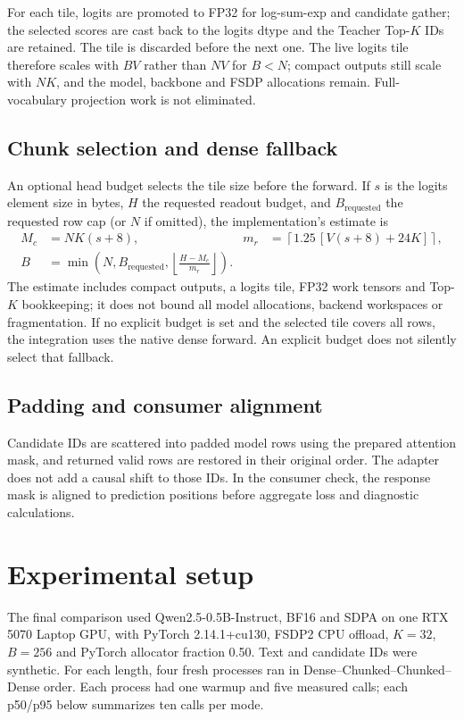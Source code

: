 \documentclass[11pt,a4paper]{article}
\begin{document}
For each tile, logits are promoted to FP32 for log-sum-exp and candidate gather; the selected scores are cast back to the logits dtype and the Teacher Top-$K$ IDs are retained. The tile is discarded before the next one. The live logits tile therefore scales with $BV$ rather than $NV$ for $B<N$; compact outputs still scale with $NK$, and the model, backbone and FSDP allocations remain. Full-vocabulary projection work is not eliminated.

\subsection{Chunk selection and dense fallback}
An optional head budget selects the tile size before the forward. If $s$ is the logits element size in bytes, $H$ the requested readout budget, and $B_{\mathrm{requested}}$ the requested row cap (or $N$ if omitted), the implementation's estimate is
\begin{align}
M_c &= NK(s+8), & m_r &= \left\lceil1.25\,[V(s+8)+24K]\right\rceil,\\
B &= \min\!\left(N,B_{\mathrm{requested}},\left\lfloor\frac{H-M_c}{m_r}\right\rfloor\right).
\end{align}
The estimate includes compact outputs, a logits tile, FP32 work tensors and Top-$K$ bookkeeping; it does not bound all model allocations, backend workspaces or fragmentation. If no explicit budget is set and the selected tile covers all rows, the integration uses the native dense forward. An explicit budget does not silently select that fallback.

\subsection{Padding and consumer alignment}
Candidate IDs are scattered into padded model rows using the prepared attention mask, and returned valid rows are restored in their original order. The adapter does not add a causal shift to those IDs. In the consumer check, the response mask is aligned to prediction positions before aggregate loss and diagnostic calculations.

\section{Experimental setup}
The final comparison used Qwen2.5-0.5B-Instruct, BF16 and SDPA on one RTX 5070 Laptop GPU, with PyTorch 2.14.1+cu130, FSDP2 CPU offload, $K=32$, $B=256$ and PyTorch allocator fraction 0.50. Text and candidate IDs were synthetic. For each length, four fresh processes ran in Dense--Chunked--Chunked--Dense order. Each process had one warmup and five measured calls; each p50/p95 below summarizes ten calls per mode.
\end{document}
